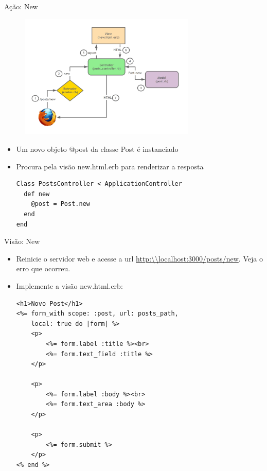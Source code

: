 \begin{frame}{Ação: New}
	\begin{figure}[h!]
		\centering
		\includegraphics[width=0.75\textwidth]{imagens/mvc-action-new.jpg}
	\end{figure}
	\framebreak
	\begin{itemize}
		\item Um novo objeto \alert{@post} da classe \alert{Post} é instanciado 
		\item Procura pela visão \alert{new.html.erb} para renderizar a resposta
		\begin{lstlisting}[style=RubyInputStyle, caption=app/controllers/posts\_controller.rb]
Class PostsController < ApplicationController
  def new
    @post = Post.new 
  end 
end
		\end{lstlisting}
	\end{itemize}
\end{frame}

\begin{frame}{Visão: New}
	\begin{itemize}
		\item Reinicie o servidor web e acesse a url \url{http:\\localhost:3000/posts/new}. Veja o erro que ocorreu.
		\item Implemente a visão \alert{new.html.erb}:
		\begin{lstlisting}[style=RubyInputStyle, caption=views/posts/new.html.erb]
<h1>Novo Post</h1>
<%= form_with scope: :post, url: posts_path, 
	local: true do |form| %>
	<p>
		<%= form.label :title %><br>
		<%= form.text_field :title %>
	</p>
	
	<p>
		<%= form.label :body %><br>
		<%= form.text_area :body %>
	</p>
	
	<p>
		<%= form.submit %>
	</p>
<% end %>	
		\end{lstlisting}
	\end{itemize}	
\end{frame}